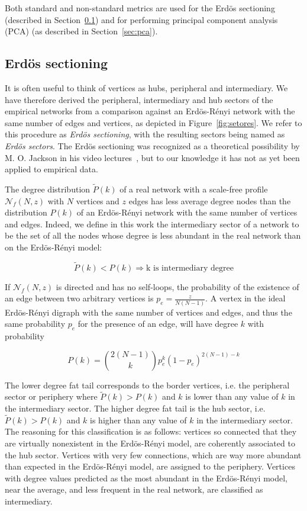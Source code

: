\documentclass[%
aip,
jmp,%
amsmath,amssymb,
reprint,%
]{revtex4-1}
\begin{document}
Both standard and non-standard metrics are used for the Erd\"os sectioning (described in Section~\ref{sectioning}) and for performing principal component analysis (PCA) (as described in Section~\ref{sec:pca}).


\subsection{Erd\"os sectioning}\label{sectioning}
It is often useful to think of vertices as hubs, peripheral and intermediary. We have therefore derived the peripheral, intermediary and hub sectors of the empirical networks from a comparison against an Erd\"os-R\'enyi network with the same number of edges and vertices,
as depicted in Figure~\ref{fig:setores}. We refer to this procedure as \emph{Erd\"os sectioning}, with the resulting sectors being named as \emph{Erd\"os sectors}. The Erd\"os sectioning was recognized as a theoretical possibility by M. O. Jackson in his video lectures~\cite{3setores}, but to our knowledge it has not as yet been applied to empirical data.

The degree distribution $\widetilde{P}(k)$ of a real network with a scale-free profile $\mathcal{N}_f(N,z)$ with $N$ vertices and $z$ edges has less
average degree nodes than the distribution $P(k)$ of an Erd\"os-R\'enyi
network with the same number of vertices and edges. Indeed, we define in this work the intermediary sector of a network to be the set of all the nodes whose degree is less abundant in the real network than on the Erd\"os-R\'enyi model:

\begin{equation}\label{criterio}
\widetilde{P}(k)<P(k) \Rightarrow \text{k is intermediary degree}
\end{equation}

If $\mathcal{N}_f(N,z)$ is directed and has no self-loops, the probability of the existence
of an edge between two arbitrary vertices is $p_e=\frac{z}{N(N-1)}$.
A vertex in the ideal Erd\"os-R\'enyi digraph with the same number of vertices and edges, and thus the same probability $p_e$ for the presence of an edge, will have degree $k$ with probability

\begin{equation}
P(k)=\binom{2(N-1)}{k}p_e^k(1-p_e)^{2(N-1)-k}
\end{equation}

The lower degree fat tail corresponds to the border vertices, i.e. the peripheral sector or periphery where $\widetilde{P}(k)>P(k)$ and $k$ is lower than any value of $k$ in the intermediary sector.
The higher degree fat tail is the hub sector, i.e. $\widetilde{P}(k)>P(k)$ and $k$ is higher than any value of $k$ in the intermediary sector. The reasoning for this classification is as follows: vertices so connected that they are virtually nonexistent in the Erd\"os-R\'enyi model, are coherently associated to the hub sector.
Vertices with very few connections, which are way more abundant than expected in the Erd\"os-R\'enyi model,
are assigned to the periphery.
Vertices with degree values predicted as the most abundant in the Erd\"os-R\'enyi model,
near the average, and less frequent in the real network, are classified as intermediary.
\end{document}
